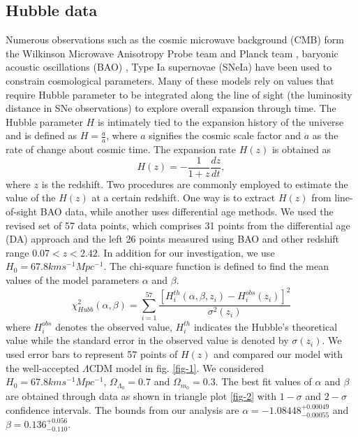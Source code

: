 \subsection{Hubble data}

Numerous observations such as the cosmic microwave background (CMB) form the Wilkinson Microwave Anisotropy Probe team \cite{Hinshaw/2013,Komatsu/2011,Spergel/2007} and Planck team \cite{Planck/2015,Planck/2018}, baryonic acoustic oscillations (BAO) \cite{Eisenstein/2005,Percival/2010}, Type Ia supernovae (SNeIa) \cite{Perlmutter/1999,Riess/1998} have been used to constrain cosmological parameters. Many of these models rely on values that require Hubble parameter to be integrated along the line of sight (the luminosity distance in SNe observations) to explore overall expansion through time. The Hubble parameter $H$ is intimately tied to the expansion history of the universe and is defined as $H=\frac{\dot{a}}{a}$, where $a$ signifies the cosmic scale factor and $\dot{a}$ as the rate of change about cosmic time. The expansion rate $H(z)$ is obtained as 
\begin{equation}
H(z)= -\frac{1}{1+z} \frac{dz}{dt},
\end{equation}
where $z$ is the redshift. 
Two procedures are commonly employed to estimate the value of the $H(z)$ at a certain redshift. One way is to extract $H(z)$ from line-of-sight BAO data, while another uses differential age methods. We used the revised set of 57 data points, which comprises 31 points from the differential age (DA) approach and the left 26 points measured using BAO and other redshift range $0.07 < z< 2.42$. In addition for our investigation, we use $H_{0}= 67.8 km s^{-1} Mpc^{-1}$. The chi-square function is defined to find the mean values of the model parameters $\alpha$ and $\beta$.
\begin{equation}
\chi^{2}_{Hubb} (\alpha, \beta)= \sum_{i=1}^{57} \dfrac{\left[ H^{th}_{i}(\alpha,\beta,z_{i})-H^{obs}_{i}(z_{i})\right]^{2} }{\sigma^{2}(z_{i})}
\end{equation}
where $H^{obs}_{i}$ denotes the observed value, $H^{th}_{i}$ indicates the Hubble's theoretical value while the standard error in the observed value is denoted by $\sigma(z_{i})$.
We used error bars to represent 57 points of $H(z)$ and compared our model with the well-accepted $\Lambda$CDM model in fig. \ref{fig-1}. We considered $H_{0}=67.8 km s^{-1} Mpc^{-1}$, $\Omega_{\Lambda_{0}}=0.7$ and $\Omega_{m_{0}}=0.3$. The best fit values of $\alpha$ and $\beta$ are obtained through data as shown in triangle plot \ref{fig-2} with $1-\sigma$ and $2-\sigma$ confidence intervals. The bounds from our analysis are $\alpha= -1.08448^{+0.00049}_{-0.00055}$ and $\beta=0.136^{+0.056}_{-0.110}$.

